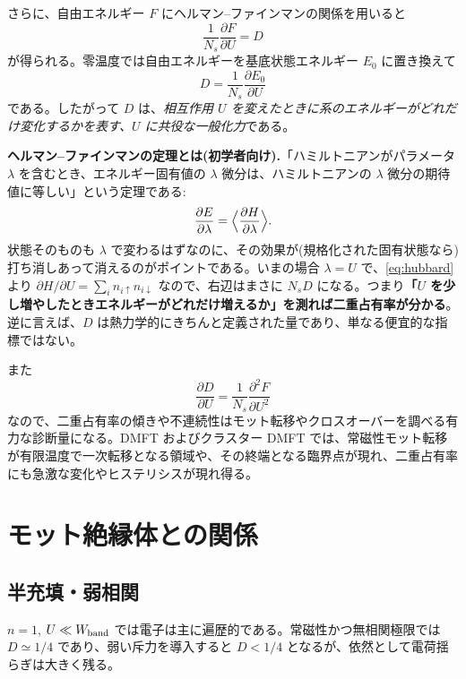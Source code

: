 \documentclass[11pt,a4paper]{ltjsarticle}
\newcommand{\up}{\uparrow}
\newcommand{\dn}{\downarrow}
\begin{document}
さらに、自由エネルギー $F$ にヘルマン--ファインマンの関係を用いると
\begin{equation}
  \boxed{\ \frac{1}{N_s}\frac{\partial F}{\partial U} = D\ }
\end{equation}
が得られる。零温度では自由エネルギーを基底状態エネルギー $E_0$ に置き換えて
\begin{equation}
  \boxed{\ D = \frac{1}{N_s}\frac{\partial E_0}{\partial U}\ }
\end{equation}
である。したがって $D$ は、\emph{相互作用 $U$ を変えたときに系のエネルギーがどれだけ変化するかを表す、$U$ に共役な一般化力}である。

\begin{keybox}
\textbf{ヘルマン--ファインマンの定理とは(初学者向け).}「ハミルトニアンがパラメータ $\lambda$ を含むとき、エネルギー固有値の $\lambda$ 微分は、ハミルトニアンの $\lambda$ 微分の期待値に等しい」という定理である:
\[
  \frac{\partial E}{\partial \lambda} = \Bigl\langle \frac{\partial H}{\partial\lambda}\Bigr\rangle .
\]
状態そのものも $\lambda$ で変わるはずなのに、その効果が(規格化された固有状態なら)打ち消しあって消えるのがポイントである。いまの場合 $\lambda=U$ で、\eqref{eq:hubbard}より $\partial H/\partial U=\sum_i n_{i\up}n_{i\dn}$ なので、右辺はまさに $N_sD$ になる。つまり\textbf{「$U$ を少し増やしたときエネルギーがどれだけ増えるか」を測れば二重占有率が分かる}。逆に言えば、$D$ は熱力学的にきちんと定義された量であり、単なる便宜的な指標ではない。
\end{keybox}

また
\begin{equation}
  \frac{\partial D}{\partial U} = \frac{1}{N_s}\frac{\partial^2F}{\partial U^2}
\end{equation}
なので、二重占有率の傾きや不連続性はモット転移やクロスオーバーを調べる有力な診断量になる。DMFT およびクラスター DMFT では、常磁性モット転移が有限温度で一次転移となる領域や、その終端となる臨界点が現れ、二重占有率にも急激な変化やヒステリシスが現れ得る。

\section{モット絶縁体との関係}

\subsection{半充填・弱相関}
$n=1$, $U\ll W_{\rm band}$ では電子は主に遍歴的である。常磁性かつ無相関極限では $D\simeq1/4$ であり、弱い斥力を導入すると $D<1/4$ となるが、依然として電荷揺らぎは大きく残る。
\end{document}
